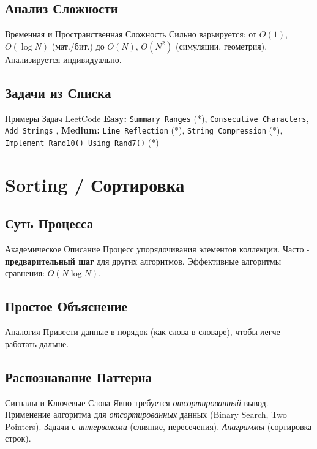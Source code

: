 \subsection{Анализ Сложности}
\begin{myblock}{Временная и Пространственная Сложность}
    Сильно варьируется: от $O(1)$, $O(\log N)$ (мат./бит.) до $O(N)$, $O(N^2)$ (симуляции, геометрия). Анализируется индивидуально.
\end{myblock}

\subsection{Задачи из Списка}
\begin{myblock}{Примеры Задач LeetCode}
    \textbf{Easy:} \texttt{Summary Ranges} (*), \texttt{Consecutive Characters}, \texttt{Add Strings} \sep
    \textbf{Medium:} \texttt{Line Reflection} (*), \texttt{String Compression} (*), \texttt{Implement Rand10() Using Rand7()} (*)
\end{myblock}

\section{Sorting / Сортировка}

\subsection{Суть Процесса}
\begin{myblock}{Академическое Описание}
    Процесс упорядочивания элементов коллекции. Часто - \textbf{предварительный шаг} для других алгоритмов. Эффективные алгоритмы сравнения: $O(N \log N)$.
\end{myblock}

\subsection{Простое Объяснение}
\begin{myblock}{Аналогия}
    Привести данные в порядок (как слова в словаре), чтобы легче работать дальше.
\end{myblock}

\subsection{Распознавание Паттерна}
\begin{myblock}{Сигналы и Ключевые Слова}
    Явно требуется \emph{отсортированный} вывод. Применение алгоритма для \emph{отсортированных} данных (Binary Search, Two Pointers). Задачи с \emph{интервалами} (слияние, пересечения). \emph{Анаграммы} (сортировка строк).
\end{myblock}

